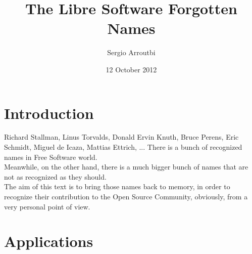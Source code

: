 \documentclass[10pt, a4paper, oneside]{report}
\begin{document}
\title{The Libre Software Forgotten Names}
\author{Sergio Arroutbi}
\date{12 October 2012}

\section* {Introduction}

Richard Stallman, Linus Torvalds, Donald Ervin Knuth, Bruce Perens, Eric Schmidt, Miguel de Icaza, Mattias Ettrich, ... There is a bunch of recognized names in Free Software world.\\ 
Meanwhile, on the other hand, there is a much bigger bunch of names that are not as recognized as they should.\\
The aim of this text is to bring those names back to memory, in order to recognize their contribution to the Open Source Community, obviously, from a very personal point of view.

\section* {Applications}
\end{document}
